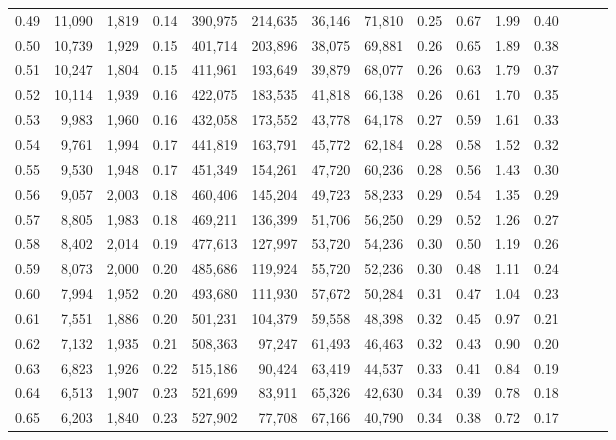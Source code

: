 \begin{tabular}{rrrrrrrrrrrrrrr}
0.49 &  11,090 &  1,819 &  0.14 &  390,975 &  214,635 &   36,146 &   71,810 &  0.25 &  0.67 &  1.99 &      0.40 \\
0.50 &  10,739 &  1,929 &  0.15 &  401,714 &  203,896 &   38,075 &   69,881 &  0.26 &  0.65 &  1.89 &      0.38 \\
0.51 &  10,247 &  1,804 &  0.15 &  411,961 &  193,649 &   39,879 &   68,077 &  0.26 &  0.63 &  1.79 &      0.37 \\
0.52 &  10,114 &  1,939 &  0.16 &  422,075 &  183,535 &   41,818 &   66,138 &  0.26 &  0.61 &  1.70 &      0.35 \\
0.53 &   9,983 &  1,960 &  0.16 &  432,058 &  173,552 &   43,778 &   64,178 &  0.27 &  0.59 &  1.61 &      0.33 \\
0.54 &   9,761 &  1,994 &  0.17 &  441,819 &  163,791 &   45,772 &   62,184 &  0.28 &  0.58 &  1.52 &      0.32 \\
0.55 &   9,530 &  1,948 &  0.17 &  451,349 &  154,261 &   47,720 &   60,236 &  0.28 &  0.56 &  1.43 &      0.30 \\
0.56 &   9,057 &  2,003 &  0.18 &  460,406 &  145,204 &   49,723 &   58,233 &  0.29 &  0.54 &  1.35 &      0.29 \\
0.57 &   8,805 &  1,983 &  0.18 &  469,211 &  136,399 &   51,706 &   56,250 &  0.29 &  0.52 &  1.26 &      0.27 \\
0.58 &   8,402 &  2,014 &  0.19 &  477,613 &  127,997 &   53,720 &   54,236 &  0.30 &  0.50 &  1.19 &      0.26 \\
0.59 &   8,073 &  2,000 &  0.20 &  485,686 &  119,924 &   55,720 &   52,236 &  0.30 &  0.48 &  1.11 &      0.24 \\
0.60 &   7,994 &  1,952 &  0.20 &  493,680 &  111,930 &   57,672 &   50,284 &  0.31 &  0.47 &  1.04 &      0.23 \\
0.61 &   7,551 &  1,886 &  0.20 &  501,231 &  104,379 &   59,558 &   48,398 &  0.32 &  0.45 &  0.97 &      0.21 \\
0.62 &   7,132 &  1,935 &  0.21 &  508,363 &   97,247 &   61,493 &   46,463 &  0.32 &  0.43 &  0.90 &      0.20 \\
0.63 &   6,823 &  1,926 &  0.22 &  515,186 &   90,424 &   63,419 &   44,537 &  0.33 &  0.41 &  0.84 &      0.19 \\
0.64 &   6,513 &  1,907 &  0.23 &  521,699 &   83,911 &   65,326 &   42,630 &  0.34 &  0.39 &  0.78 &      0.18 \\
0.65 &   6,203 &  1,840 &  0.23 &  527,902 &   77,708 &   67,166 &   40,790 &  0.34 &  0.38 &  0.72 &      0.17 \\

\end{tabular}
